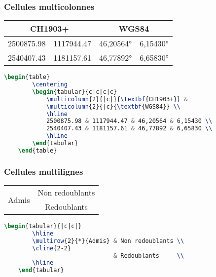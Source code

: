 \begin{frame}[containsverbatim]
    \frametitle{Cellules multicolonnes}
    \begin{table}
        \centering
        \begin{tabular}{c|c|c|c}
            \multicolumn{2}{c|}{\textbf{CH1903+}} & \multicolumn{2}{|c}{\textbf{WGS84}} \\
            \hline
            2500875.98 & 1117944.47 & \ang{46,20564} & \ang{6,15430} \\
            2540407.43 & 1181157.61 & \ang{46,77892} & \ang{6,65830} \\
            \hline
        \end{tabular}
    \end{table}
    \footnotesize
    \begin{lstlisting}[language=TeX]
    \begin{table}
        \centering
        \begin{tabular}{c|c|c|c}
            \multicolumn{2}{|c|}{\textbf{CH1903+}} & 
            \multicolumn{2}{|c}{\textbf{WGS84}} \\
            \hline
            2500875.98 & 1117944.47 & 46,20564 & 6,15430 \\
            2540407.43 & 1181157.61 & 46,77892 & 6,65830 \\
            \hline
        \end{tabular}
    \end{table}
    \end{lstlisting}
\end{frame}


\begin{frame}[containsverbatim]
    \frametitle{Cellules multilignes}
    \begin{table}
        \centering
        \begin{tabular}{|c|c|}
            \hline
            \multirow{2}{*}{Admis} & Non redoublants \\
            \cline{2-2}
                                   & Redoublants     \\
            \hline
        \end{tabular}
    \end{table}
    \begin{lstlisting}[language=TeX]
    \begin{tabular}{|c|c|}
        \hline
        \multirow{2}{*}{Admis} & Non redoublants \\
        \cline{2-2}
                               & Redoublants     \\
        \hline
    \end{tabular}
    \end{lstlisting}
\end{frame}


